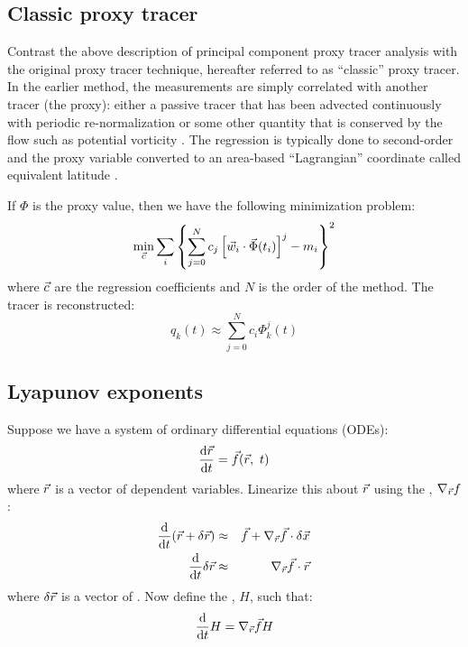 \subsection{Classic proxy tracer}

\label{classic}

Contrast the above description of principal component proxy tracer
analysis with the original proxy tracer technique, hereafter
referred to as ``classic'' proxy tracer.
In the earlier method, the measurements are simply correlated with another
tracer (the proxy): either a passive tracer that has been advected
continuously with periodic re-normalization \citep{Allen_Nakamura2003} 
or some other quantity that is conserved by the flow 
such as potential vorticity \citep{Randall_etal2002,Hoskins_etal1985}.
The regression is typically done to second-order and the proxy variable
converted to an area-based ``Lagrangian'' coordinate called
equivalent latitude \citep{Butchart_Remsberg1986}.

If $\Phi$ is the proxy value, then we have the following minimization
problem:
\begin{equation}
  \min_{\vec c} \sum_i \left \lbrace \sum_{j=0}^N c_j \left [\vec w_i \cdot \vec \Phi(t_i) \right ]^j - m_i \right \rbrace^2
\end{equation}
where $\vec c$ are the regression coefficients and $N$ is the order of the
method. The tracer is reconstructed:
\begin{equation}
	q_k(t) \approx \sum_{j=0}^N c_i \Phi_k^j(t)
\end{equation}

\subsection{Lyapunov exponents}

Suppose we have a system of ordinary differential equations (ODEs):
\begin{equation}
	\frac{\mathrm d \vec r}{\mathrm d t} = \vec f(\vec r, ~ t)
	\label{ODE}
\end{equation}
where $\vec r$ is a vector of dependent variables.
Linearize this about $\vec r$ using the ,
$\nabla_{\vec r} f$:
\begin{eqnarray}
\frac{\mathrm d}{\mathrm d t} (\vec r + \delta \vec r) & \approx & \vec f + 
	\nabla_{\vec r} \vec f \cdot \delta \vec x \\
	\frac{\mathrm d}{\mathrm d t} \delta \vec r & \approx & \nabla_{\vec r} \vec f \cdot \vec r
\end{eqnarray}
where $\delta \vec r$ is a vector of .
Now define the , $H$, such that:
\begin{equation} 
	\frac{\mathrm d}{\mathrm d t} H = \nabla_{\vec r} \vec f H \\
\end{equation}

